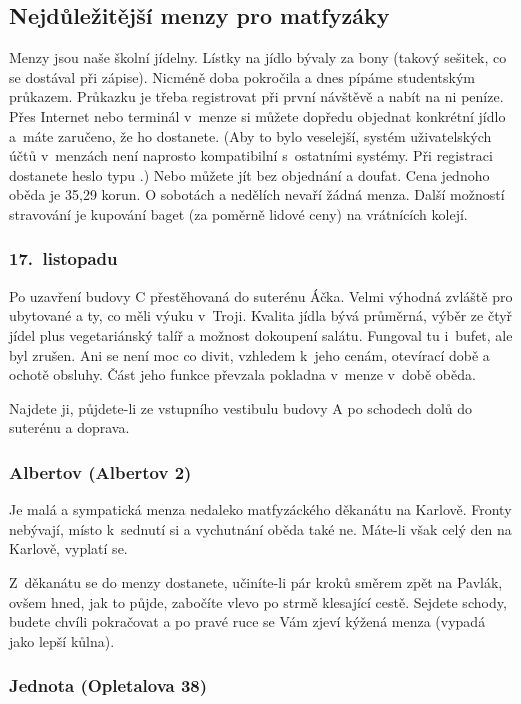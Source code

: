 \subsection{Nejdůležitější menzy pro matfyzáky}

Menzy jsou naše školní jídelny. Lístky na jídlo bývaly za bony
(takový sešitek, co se dostával při zápise). Nicméně doba
pokročila a dnes pípáme studentským průkazem. Průkazku je třeba
registrovat při první návštěvě a nabít na ni peníze. Přes Internet
nebo terminál v~menze si můžete dopředu objednat konkrétní jídlo
a~máte zaručeno, že ho dostanete. (Aby to bylo veselejší, systém uživatelských účtů v~menzách není naprosto kompatibilní s~ostatními systémy. Při registraci dostanete heslo typu .) Nebo můžete jít bez objednání
 a doufat. Cena jednoho oběda je 35,29 korun.
O sobotách a nedělích nevaří žádná menza. Další možností
stravování je kupování baget (za poměrně lidové ceny) na
vrátnících kolejí.

\subsubsection{17.~listopadu}
Po uzavření budovy C přestěhovaná do suterénu Áčka.
Velmi výhodná zvláště pro ubytované a ty, co měli výuku v~Troji.
Kvalita jídla bývá průměrná, výběr ze čtyř jídel plus
vegetariánský talíř a možnost dokoupení salátu. Fungoval tu
i~bufet, ale byl zrušen. Ani se není moc co divit, vzhledem k~jeho
cenám, otevírací době a ochotě obsluhy. Část jeho funkce převzala
pokladna v~menze v~době oběda.

Najdete ji, půjdete-li ze vstupního vestibulu budovy A po schodech dolů do suterénu a doprava.

\subsubsection{Albertov (Albertov 2)} 

Je malá a sympatická menza nedaleko
matfyzáckého děkanátu na Karlově. Fron\-ty nebývají, místo
k~sednutí si a vychutnání oběda také ne. Máte-li však celý den na
Karlově, vyplatí se.

Z~děkanátu se do menzy dostanete,
učiníte-li pár kroků směrem zpět na Pavlák, ovšem hned, jak to
půjde, zabočíte vlevo po strmě klesající cestě. Sejdete schody,
budete chvíli pokračovat a po pravé ruce se Vám zjeví kýžená menza
(vypadá jako lepší kůlna).

\subsubsection{Jednota (Opletalova 38)} 

